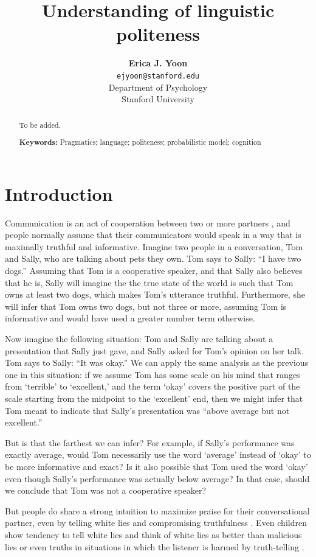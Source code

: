 \documentclass[10pt,letterpaper]{article}
\title{Understanding of linguistic politeness}
\author{{\large \bf Erica J. Yoon} \\
  \texttt{ejyoon@stanford.edu} \\
  Department of Psychology \\
  Stanford University}
\begin{document}
\maketitle

\begin{abstract}
To be added.

\textbf{Keywords:} 
Pragmatics; language; politeness; probabilistic model; cognition

\end{abstract}

\section{Introduction}

Communication is an act of cooperation between two or more partners \cite{grice1975logic}, and people normally assume that their communicators would speak in a way that is maximally truthful and informative. Imagine two people in a conversation, Tom and Sally, who are talking about pets they own. Tom says to Sally: ``I have two dogs.'' Assuming that Tom is a cooperative speaker, and that Sally also believes that he is, Sally will imagine the the true state of the world is such that Tom owns at least two dogs, which makes Tom's utterance truthful. Furthermore, she will infer that Tom owns two dogs, but not three or more, assuming Tom is informative and would have used a greater number term otherwise.

Now imagine the following situation: Tom and Sally are talking about a presentation that Sally just gave, and Sally asked for Tom's opinion on her talk. Tom says to Sally: ``It was okay.'' We can apply the same analysis as the previous one in this situation: if we assume Tom has some scale on his mind that ranges from `terrible' to `excellent,' and the term `okay' covers the positive part of the scale starting from the midpoint to the `excellent' end, then we might infer that Tom meant to indicate that Sally's presentation was ``above average but not excellent.''

But is that the farthest we can infer? For example, if Sally's performance was exactly average, would Tom necessarily use the word `average' instead of `okay' to be more informative and exact? Is it also possible that Tom used the word `okay' even though Sally's performance was actually below average? In that case, should we conclude that Tom was not a cooperative speaker? 

But people do share a strong intuition to maximize praise for their conversational partner, even by telling white lies and compromising truthfulness \cite{depaulo1998everyday}. Even children show tendency to tell white lies and think of white lies as better than malicious lies or even truths in situations in which the listener is harmed by truth-telling \cite{talwar2007white, bussey1999children}.
\end{document}
